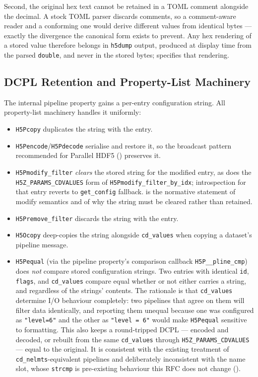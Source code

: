 \documentclass[../RFC-HDFG-2026-001.tex]{subfiles}
\begin{document}
Second, the original hex text cannot be retained in a TOML comment
alongside the decimal.  A stock TOML parser discards comments, so a
comment-aware reader and a conforming one would derive different values
from identical bytes --- exactly the divergence the canonical form exists
to prevent.  Any hex rendering of a stored value therefore belongs in
\texttt{h5dump} output, produced at display time from the parsed
\texttt{double}, and never in the stored bytes;
 specifies that rendering.

\subsection{DCPL Retention and Property-List Machinery}
\label{sec:dcpl-retention}

The internal pipeline property gains a per-entry configuration string.
All property-list machinery handles it uniformly:

\begin{itemize}
\item \texttt{H5Pcopy} duplicates the string with the entry.
\item \texttt{H5Pencode}/\texttt{H5Pdecode} serialise and restore it, so
  the broadcast pattern recommended for Parallel HDF5
  () preserves it.
\item \texttt{H5Pmodify\_filter} \emph{clears} the stored string for the
  modified entry, as does the \texttt{H5Z\_PARAMS\_CDVALUES} form of
  \texttt{H5Pmodify\_filter\_by\_idx}; introspection for that entry reverts
  to \texttt{get\_config} fallback.   is the
  normative statement of modify semantics and of why the string must be
  cleared rather than retained.
\item \texttt{H5Premove\_filter} discards the string with the entry.
\item \texttt{H5Ocopy} deep-copies the string alongside \texttt{cd\_values}
  when copying a dataset's pipeline message.
\item \texttt{H5Pequal} (via the pipeline property's comparison callback
  \texttt{H5P\_\_pline\_cmp}) does \emph{not} compare stored configuration
  strings.  Two entries with identical \texttt{id}, \texttt{flags}, and
  \texttt{cd\_values} compare equal whether or not either carries a
  string, and regardless of the strings' contents.  The rationale is that
  \texttt{cd\_values} determine I/O behaviour completely: two pipelines
  that agree on them will filter data identically, and reporting them
  unequal because one was configured as \texttt{"level=6"} and the other
  as \texttt{"level = 6"} would make \texttt{H5Pequal} sensitive to
  formatting.  This also keeps a round-tripped DCPL --- encoded and
  decoded, or rebuilt from the same \texttt{cd\_values} through
  \texttt{H5Z\_PARAMS\_CDVALUES} --- equal to the original.  It is consistent with the existing treatment of
  \texttt{cd\_nelmts}-equivalent pipelines and deliberately inconsistent
  with the name slot, whose \texttt{strcmp} is pre-existing behaviour this
  RFC does not change ().
\end{itemize}
\end{document}
